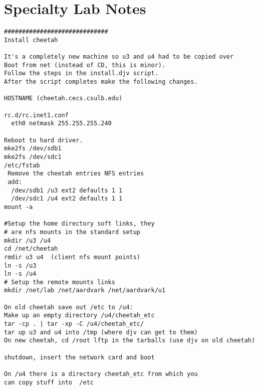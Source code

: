 \chapter{Specialty Lab Notes} \label{ap:special}

\begin{verbatim}
#############################
Install cheetah

It's a completely new machine so u3 and u4 had to be copied over
Boot from net (instead of CD, this is minor).
Follow the steps in the install.djv script.
After the script completes make the following changes.

HOSTNAME (cheetah.cecs.csulb.edu)

rc.d/rc.inet1.conf
  eth0 netmask 255.255.255.240

Reboot to hard driver.
mke2fs /dev/sdb1
mke2fs /dev/sdc1
/etc/fstab
 Remove the cheetah entries NFS entries
 add:
  /dev/sdb1 /u3 ext2 defaults 1 1
  /dev/sdc1 /u4 ext2 defaults 1 1
mount -a

#Setup the home directory soft links, they
# are nfs mounts in the standard setup
mkdir /u3 /u4
cd /net/cheetah
rmdir u3 u4  (client nfs mount points)
ln -s /u3
ln -s /u4
# Setup the remote mounts links
mkdir /net/lab /net/aardvark /net/aardvark/u1

On old cheetah save out /etc to /u4:
Make up an empty directory /u4/cheetah_etc
tar -cp . | tar -xp -C /u4/cheetah_etc/
tar up u3 and u4 into /tmp (where djv can get to them)
On new cheetah, cd /root lftp in the tarballs (use djv on old cheetah)

shutdown, insert the network card and boot

On /u4 there is a directory cheetah_etc from which you
can copy stuff into  /etc


\end{verbatim}
